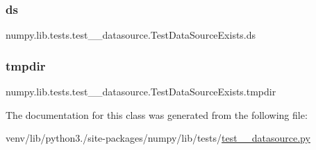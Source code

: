 \subsubsection{\texorpdfstring{ds}{ds}}
{\footnotesize\ttfamily numpy.\+lib.\+tests.\+test\+\_\+\+\_\+datasource.\+Test\+Data\+Source\+Exists.\+ds}

\mbox{\label{classnumpy_1_1lib_1_1tests_1_1test____datasource_1_1TestDataSourceExists_accd454200ac09443a174fe7e42bde9c9}} 
\subsubsection{\texorpdfstring{tmpdir}{tmpdir}}
{\footnotesize\ttfamily numpy.\+lib.\+tests.\+test\+\_\+\+\_\+datasource.\+Test\+Data\+Source\+Exists.\+tmpdir}



The documentation for this class was generated from the following file\+:\begin{DoxyCompactItemize}
\item 
venv/lib/python3./site-\/packages/numpy/lib/tests/\hyperlink{test____datasource_8py}{test\+\_\+\+\_\+datasource.\+py}\end{DoxyCompactItemize}

